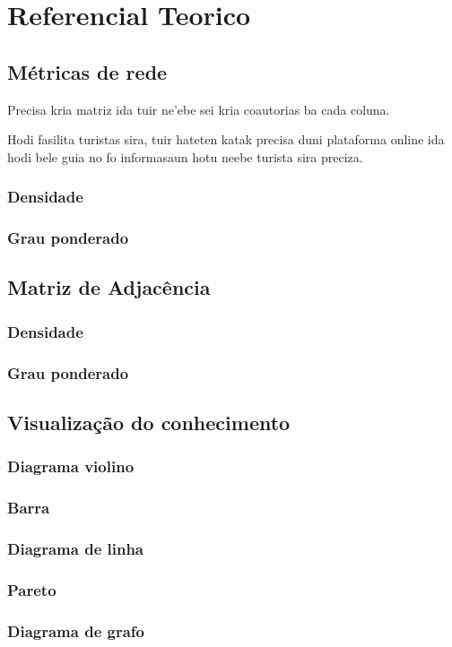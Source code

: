 
\chapter{Referencial Teorico}

\section{Métricas de rede}
Precisa kria matriz ida tuir \citep{Rosen} ne'ebe sei kria coautorias ba cada coluna.

Hodi fasilita turistas sira, tuir \citep{Jaime2017} hateten katak precisa duni plataforma online ida hodi bele guia no fo informasaun hotu neebe turista sira preciza.

\subsection{Densidade}
\subsection{Grau ponderado}


\section{Matriz de Adjacência}
\subsection{Densidade}
\subsection{Grau ponderado}

\section{Visualização do conhecimento}
\subsection{Diagrama violino}
\subsection{Barra}
\subsection{Diagrama de linha}
\subsection{Pareto}
\subsection{Diagrama de grafo}